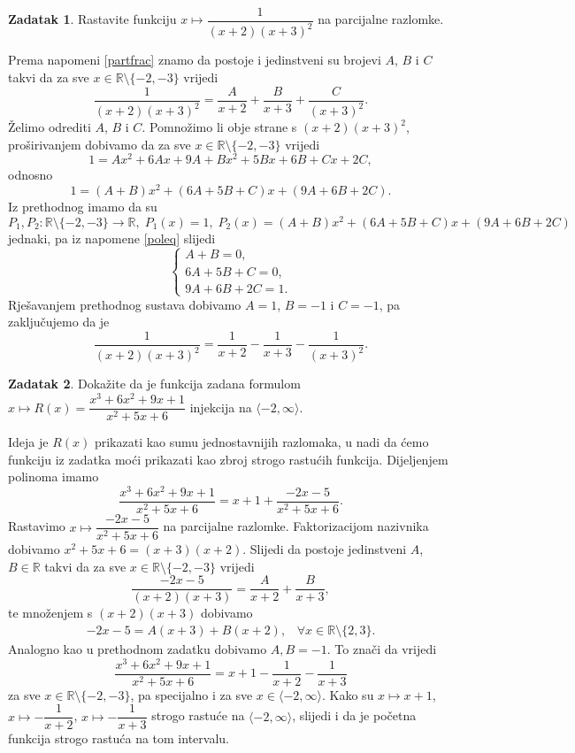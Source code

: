 \documentclass{book}
\renewenvironment{proof}{%
    \vspace{-\parskip}\begin{oldproof}%
    }{%
    \end{oldproof}%
}
\theoremstyle{definition}
\theoremstyle{definition}
\newtheorem{exercise}{Zadatak}
\theoremstyle{remark}
\begin{document}
\begin{exercise}
Rastavite funkciju $x\mapsto \dfrac{1}{(x+2)(x+3)^2}$ na parcijalne razlomke.
\end{exercise}
\begin{proof}[Rješenje]
Prema napomeni \ref{partfrac} znamo da postoje i jedinstveni su brojevi $A$, $B$ i $C$ takvi da za sve $x\in \mathbb{R}\setminus\{-2, -3\}$ vrijedi
$$\dfrac{1}{(x+2)(x+3)^2}=\dfrac{A}{x+2}+\dfrac{B}{x+3}+\dfrac{C}{(x+3)^2}.$$
Želimo odrediti $A$, $B$ i $C$. Pomnožimo li obje strane s $(x+2)(x+3)^2$, proširivanjem dobivamo da za sve $x\in \mathbb{R}\setminus\{-2, -3\}$ vrijedi
$$1=Ax^2+6Ax+9A+Bx^2+5Bx+6B+Cx+2C,$$
odnosno
$$1=(A+B)x^2+(6A+5B+C)x+(9A+6B+2C).$$
Iz prethodnog imamo da su $$P_1, P_2 : \mathbb{R}\setminus\{-2, -3\}\to \mathbb{R},\;P_1(x)=1,\; P_2(x)= (A+B)x^2+(6A+5B+C)x+(9A+6B+2C)$$ jednaki, pa iz napomene \ref{poleq} slijedi
$$\begin{cases}
A+B=0, \\
6A+5B+C=0, \\
9A+6B+2C=1.
   \end{cases}$$
Rješavanjem prethodnog sustava dobivamo $A=1$, $B=-1$ i $C=-1$, pa zaključujemo da je
$$\dfrac{1}{(x+2)(x+3)^2}=\dfrac{1}{x+2}-\dfrac{1}{x+3}-\dfrac{1}{(x+3)^2}.$$
\end{proof}
\begin{exercise}
Dokažite da je funkcija zadana formulom $x\mapsto R(x)=\dfrac{x^3+6x^2+9x+1}{x^2+5x+6}$ injekcija na $\langle -2, \infty\rangle$.
\end{exercise}
\begin{proof}[Rješenje]
Ideja je $R(x)$ prikazati kao sumu jednostavnijih razlomaka, u nadi da ćemo funkciju iz zadatka moći prikazati kao zbroj strogo rastućih funkcija. Dijeljenjem polinoma imamo
$$\dfrac{x^3+6x^2+9x+1}{x^2+5x+6}=x+1+\dfrac{-2x-5}{x^2+5x+6}.$$
Rastavimo $x\mapsto \dfrac{-2x-5}{x^2+5x+6}$ na parcijalne razlomke. Faktorizacijom nazivnika dobivamo $x^2+5x+6=(x+3)(x+2)$. Slijedi da postoje jedinstveni $A$, $B\in \mathbb{R}$ takvi da za sve $x\in \mathbb{R}\setminus\{-2, -3\}$ vrijedi
$$\dfrac{-2x-5}{(x+2)(x+3)}=\dfrac{A}{x+2}+\dfrac{B}{x+3},$$
te množenjem s $(x+2)(x+3)$ dobivamo 
\begin{gather}
\label{partfrac2}
-2x-5=A(x+3)+B(x+2),\;\;\; \forall x\in \mathbb{R}\setminus\{2, 3\}.
\end{gather}
Analogno kao u prethodnom zadatku dobivamo $A, B=-1$. To znači da vrijedi
$$\dfrac{x^3+6x^2+9x+1}{x^2+5x+6}=x+1-\dfrac{1}{x+2}-\dfrac{1}{x+3}$$
za sve $x\in \mathbb{R}\setminus\{-2, -3\}$, pa specijalno i za sve $x\in\langle -2,\infty \rangle$. Kako su $x\mapsto x+1$, $x\mapsto -\dfrac{1}{x+2}$, $x\mapsto -\dfrac{1}{x+3}$ strogo rastuće na $\langle -2,\infty \rangle$, slijedi i da je početna funkcija strogo rastuća na tom intervalu.
\end{proof}
\end{document}
